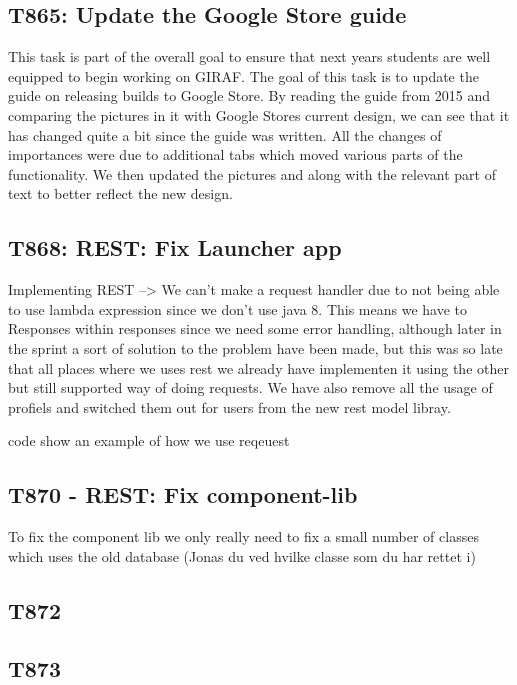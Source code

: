 \subsection{T865: Update the Google Store guide}

This task is part of the overall goal to ensure that next years students are
well equipped to begin working on GIRAF. The goal of this task is to update the
guide on releasing builds to Google Store. By reading the guide from 2015 and
comparing the pictures in it with Google Stores current design, we can see that
it has changed quite a bit since the guide was written. All the changes of
importances were due to additional tabs which moved various parts of the
functionality. We then updated the pictures and along with the relevant part of
text to better reflect the new design.


\subsection{T868: REST: Fix Launcher app}
Implementing REST --> We can't make a request handler due to not being able
to use lambda expression since we don't use java 8.
This means we have to Responses within responses since we need some error
handling, although later in the sprint a sort of solution to the problem have
been made, but this was so late that all places where we uses rest we already
have implementen it using the other but still supported way of doing requests.
We have also remove all the usage of profiels and switched them out for users
from the new rest model libray.

code show an example of how we use reqeuest

\subsection{T870 - REST: Fix component-lib}
To fix the component lib we only really need to fix a small number of classes
which uses the old database (Jonas du ved hvilke classe som du har rettet i)

\subsection{T872}

\subsection{T873}

